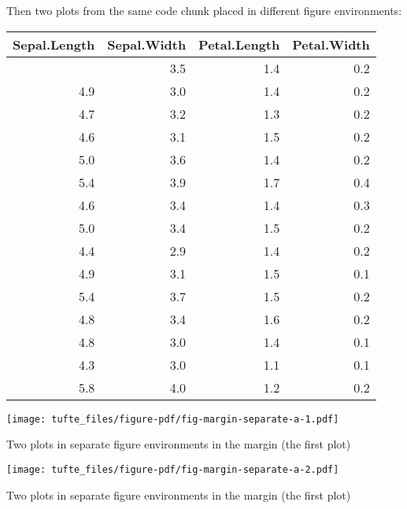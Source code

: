 \documentclass[
  letterpaper,
  DIV=11,
  numbers=noendperiod,
  oneside]{scrartcl}
\begin{document}
Then two plots from the same code chunk placed in different figure
environments:

\begin{longtable}[]{@{}rrrr@{}}
\toprule\noalign{}
Sepal.Length & Sepal.Width & Petal.Length & Petal.Width \\
\midrule\noalign{}
\endhead
\bottomrule\noalign{}
\endlastfoot
5.1 & 3.5 & 1.4 & 0.2 \\
4.9 & 3.0 & 1.4 & 0.2 \\
4.7 & 3.2 & 1.3 & 0.2 \\
4.6 & 3.1 & 1.5 & 0.2 \\
5.0 & 3.6 & 1.4 & 0.2 \\
5.4 & 3.9 & 1.7 & 0.4 \\
4.6 & 3.4 & 1.4 & 0.3 \\
5.0 & 3.4 & 1.5 & 0.2 \\
4.4 & 2.9 & 1.4 & 0.2 \\
4.9 & 3.1 & 1.5 & 0.1 \\
5.4 & 3.7 & 1.5 & 0.2 \\
4.8 & 3.4 & 1.6 & 0.2 \\
4.8 & 3.0 & 1.4 & 0.1 \\
4.3 & 3.0 & 1.1 & 0.1 \\
5.8 & 4.0 & 1.2 & 0.2 \\
\end{longtable}

\begin{marginfigure}

{\centering \texttt{[image: tufte\_files/figure-pdf/fig-margin-separate-a-1.pdf]}

}

\caption{\label{fig-margin-separate-a-1}Two plots in separate figure
environments in the margin (the first plot)}

\end{marginfigure}

\begin{marginfigure}

{\centering \texttt{[image: tufte\_files/figure-pdf/fig-margin-separate-a-2.pdf]}

}

\caption{\label{fig-margin-separate-a-2}Two plots in separate figure
environments in the margin (the first plot)}

\end{marginfigure}
\end{document}
